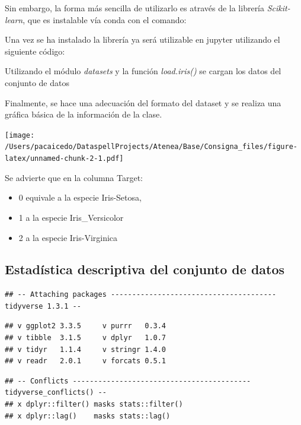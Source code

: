 \documentclass[11pt,]{article}
\def\tightlist{}
\begin{document}
Sin embargo, la forma más sencilla de utilizarlo es através de la
librería \emph{Scikit-learn}, que es instalable vía conda con el
comando:

Una vez se ha instalado la librería ya será utilizable en jupyter
utilizando el siguiente código:

Utilizando el módulo \emph{datasets} y la función \emph{load.iris()} se
cargan los datos del conjunto de datos

Finalmente, se hace una adecuación del formato del dataset y se realiza
una gráfica básica de la información de la clase.

\tiny

\texttt{[image: /Users/pacaicedo/DataspellProjects/Atenea/Base/Consigna\_files/figure-latex/unnamed-chunk-2-1.pdf]}

\normalsize

Se advierte que en la columna Target:

\begin{itemize}
\tightlist
\item
  0 equivale a la especie Iris-Setosa,
\item
  1 a la especie Iris\_Versicolor
\item
  2 a la especie Iris-Virginica
\end{itemize}

\hypertarget{estaduxedstica-descriptiva-del-conjunto-de-datos}{%
\subsection{Estadística descriptiva del conjunto de
datos}\label{estaduxedstica-descriptiva-del-conjunto-de-datos}}

\begin{verbatim}
## -- Attaching packages --------------------------------------- tidyverse 1.3.1 --
\end{verbatim}

\begin{verbatim}
## v ggplot2 3.3.5     v purrr   0.3.4
## v tibble  3.1.5     v dplyr   1.0.7
## v tidyr   1.1.4     v stringr 1.4.0
## v readr   2.0.1     v forcats 0.5.1
\end{verbatim}

\begin{verbatim}
## -- Conflicts ------------------------------------------ tidyverse_conflicts() --
## x dplyr::filter() masks stats::filter()
## x dplyr::lag()    masks stats::lag()
\end{verbatim}
\end{document}
